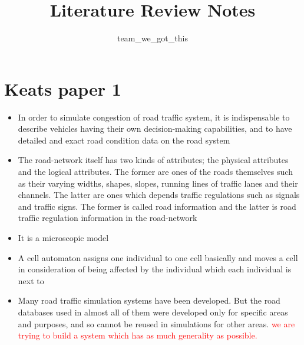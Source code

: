 \documentclass[]{article}
\title{Literature Review Notes}
\author{team\_we\_got\_this}
\begin{document}
\maketitle


\section*{Keats paper 1}
	\begin{itemize}
		\item  In order to simulate congestion of road traffic system, it is indispensable to describe vehicles having their own decision-making capabilities, and to have detailed and exact road condition data on the road system
		\item The road-network itself has two kinds of attributes; the physical attributes and the logical attributes.
		 The former are ones of the roads themselves such as their varying widths, shapes, slopes, running lines of traffic lanes and their channels. 
		 The latter are ones which depends traffic regulations such as signals and traffic signs. 
		 The former is called road information and the latter is road traffic regulation information in the road-network
		 \item It is a microscopic model 
		 \item A cell automaton assigns one individual to one cell basically and moves a cell in consideration of being affected by the individual which each individual is next to
		 \item Many road traffic simulation systems have been developed. But the road databases used in almost all of them were developed only for specific areas and purposes, and so cannot be reused in simulations for other areas. \textcolor{red}{we are trying to build a system which has as much generality as possible.} \cite{namekawa2005general}
		 
	\end{itemize}
	
\end{document}
